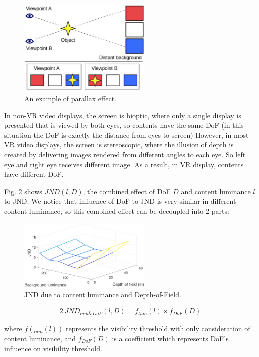 \begin{figure}
  \centering
  \includegraphics[width=2.5in]{images/ver-acc.jpg}
  \caption{An example of parallax effect.}
  \label{v-aconflict}
  \end{figure}

In non-VR video displays, the screen is bioptic, where only a single display is presented that is viewed by both eyes, so contents have the same DoF (in this situation the DoF is exactly the distance from eyes to screen) However, in most VR video displays, the screen is stereoscopic, where the illusion of depth is created by delivering images rendered from different angles to each eye. So left eye and right eye receives different image. As a result, in VR display, contents have different DoF.

Fig. \ref{JNDdof-lum} shows $JND(l, D)$, the combined effect of DoF $D$ and content luminance $l$ to JND. We notice that influence of DoF to JND is very similar in different content luminance, so this combined effect can be decoupled into 2 parts:

\begin{figure}
  \centering
  \includegraphics[width=2.5in]{images/JNDdof-lum.eps}
  \caption{JND due to content luminance and Depth-of-Field.}
  \label{JNDdof-lum}
  \end{figure}

\begin{alignat}{2}\
JND_{lum\&DoF}(l, D) = f_{lum}(l) \times f_{DoF}(D)
\end{alignat}

where $f(_{lum}(l))$ represents the visibility threshold with only consideration of content luminance, and $f_{DoF}(D)$ is a coefficient which represents DoF's influence on visibility threshold.

